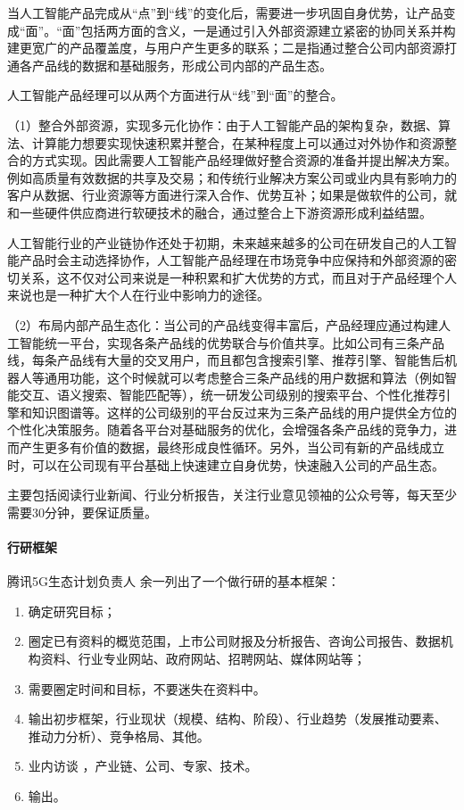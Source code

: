 \documentclass[letterpaper,10pt,english]{sphinxmanual}
\begin{document}
当人工智能产品完成从“点”到“线”的变化后，需要进一步巩固自身优势，让产品变成“面”。“面”包括两方面的含义，一是通过引入外部资源建立紧密的协同关系并构建更宽广的产品覆盖度，与用户产生更多的联系；二是指通过整合公司内部资源打通各产品线的数据和基础服务，形成公司内部的产品生态。

人工智能产品经理可以从两个方面进行从“线”到“面”的整合。

（1）整合外部资源，实现多元化协作：由于人工智能产品的架构复杂，数据、算法、计算能力想要实现快速积累并整合，在某种程度上可以通过对外协作和资源整合的方式实现。因此需要人工智能产品经理做好整合资源的准备并提出解决方案。例如高质量有效数据的共享及交易；和传统行业解决方案公司或业内具有影响力的客户从数据、行业资源等方面进行深入合作、优势互补；如果是做软件的公司，就和一些硬件供应商进行软硬技术的融合，通过整合上下游资源形成利益结盟。

人工智能行业的产业链协作还处于初期，未来越来越多的公司在研发自己的人工智能产品时会主动选择协作，人工智能产品经理在市场竞争中应保持和外部资源的密切关系，这不仅对公司来说是一种积累和扩大优势的方式，而且对于产品经理个人来说也是一种扩大个人在行业中影响力的途径。

（2）布局内部产品生态化：当公司的产品线变得丰富后，产品经理应通过构建人工智能统一平台，实现各条产品线的优势联合与价值共享。比如公司有三条产品线，每条产品线有大量的交叉用户，而且都包含搜索引擎、推荐引擎、智能售后机器人等通用功能，这个时候就可以考虑整合三条产品线的用户数据和算法（例如智能交互、语义搜索、智能匹配等），统一研发公司级别的搜索平台、个性化推荐引擎和知识图谱等。这样的公司级别的平台反过来为三条产品线的用户提供全方位的个性化决策服务。随着各平台对基础服务的优化，会增强各条产品线的竞争力，进而产生更多有价值的数据，最终形成良性循环。另外，当公司有新的产品线成立时，可以在公司现有平台基础上快速建立自身优势，快速融入公司的产品生态。

主要包括阅读行业新闻、行业分析报告，关注行业意见领袖的公众号等，每天至少需要30分钟，要保证质量。


\paragraph{行研框架}
\label{\detokenize{chapter_knowledge/industry_analysis:id21}}
腾讯5G生态计划负责人 余一列出了一个做行研的基本框架：
\begin{enumerate}
%
\item {} 
确定研究目标；

\item {} 
圈定已有资料的概览范围，上市公司财报及分析报告、咨询公司报告、数据机构资料、行业专业网站、政府网站、招聘网站、媒体网站等；

\item {} 
需要圈定时间和目标，不要迷失在资料中。

\item {} 
输出初步框架，行业现状（规模、结构、阶段）、行业趋势（发展推动要素、推动力分析）、竞争格局、其他。

\item {} 
业内访谈 ，产业链、公司、专家、技术。

\item {} 
输出。

\end{enumerate}
\end{document}
